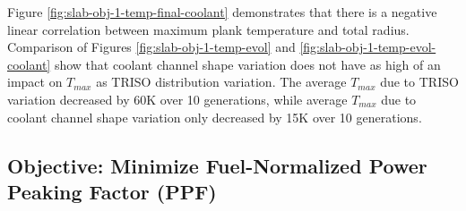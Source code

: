 Figure \ref{fig:slab-obj-1-temp-final-coolant} demonstrates that there is a negative 
linear correlation between maximum plank temperature and total radius. 
Comparison of Figures \ref{fig:slab-obj-1-temp-evol} and 
\ref{fig:slab-obj-1-temp-evol-coolant} show that coolant channel shape variation 
does not have as high of an impact on $T_{max}$ as \gls{TRISO} distribution variation.  
The average $T_{max}$ due to \gls{TRISO} variation decreased by 60K over 10 generations, 
while average $T_{max}$ due to coolant channel shape variation only decreased by 15K
over 10 generations. 

\subsection{Objective: Minimize Fuel-Normalized Power Peaking Factor (PPF)}


